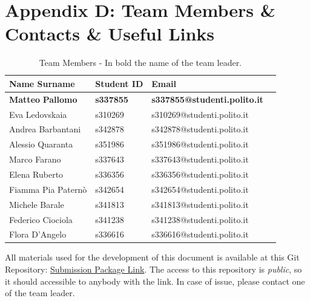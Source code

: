 \documentclass[sigconf]{acmart}
\begin{document}
\section{Appendix D: Team Members \& Contacts \& Useful Links}
\begin{table}[h]
\centering
\begin{tabular}{llll}
\toprule
\textbf{Name Surname } & \textbf{Student ID} & \textbf{Email} \\
\midrule
\textbf{Matteo} \textbf{Pallomo}     & \textbf{ s337855 } & \textbf{s337855@studenti.polito.it} \\
Eva         Ledovskaia  & s310269 & s310269@studenti.polito.it \\
Andrea      Barbantani  & s342878 & s342878@studenti.polito.it \\
Alessio     Quaranta    & s351986 & s351986@studenti.polito.it \\
Marco       Farano      & s337643 & s337643@studenti.polito.it \\
Elena       Ruberto     & s336356 & s336356@studenti.polito.it \\
Fiamma Pia  Paternò     & s342654 & s342654@studenti.polito.it \\
Michele     Barale      & s341813 & s341813@studenti.polito.it \\
Federico    Ciociola    & s341238 & s341238@studenti.polito.it \\
Flora       D'Angelo    & s336616 & s336616@studenti.polito.it \\
\bottomrule
\end{tabular}
\caption{Team Members - In bold the name of the team leader.}
\label{tab:team_members}
\end{table}

All materials used for the development of this document is available at this Git Repository:
\href{https://github.com/pall095/10DOT_ScopingReview_ExtraMaterial}{Submission Package Link}.
The access to this repository is \emph{public}, so it should accessible to anybody with the link. In case of issue, please contact one of the team leader.


\end{document}

